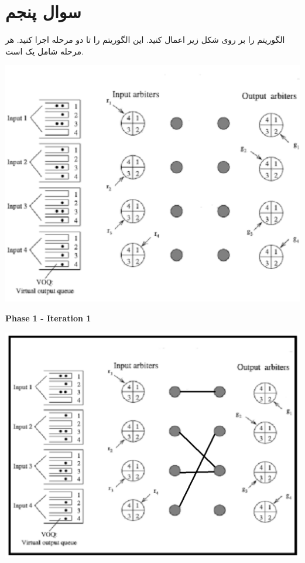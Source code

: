 \section{سوال پنجم}

الگوریتم  را بر روی شکل زیر اعمال کنید. این الگوریتم را تا دو مرحله اجرا کنید. هر مرحله شامل یک  است.

\begin{center}
	\includegraphics*[width=0.6\linewidth]{pics/img3.png}
	\label{شکل مورد نظر}
\end{center}


\begin{qsolve}
	\begin{latin}
		\textbf{Phase 1 - Iteration 1}\\
		
		\begin{center}
			\includegraphics*[width=0.7\linewidth]{pics/img14.png}
		\end{center}
	\end{latin}
\end{qsolve}
\newpage


